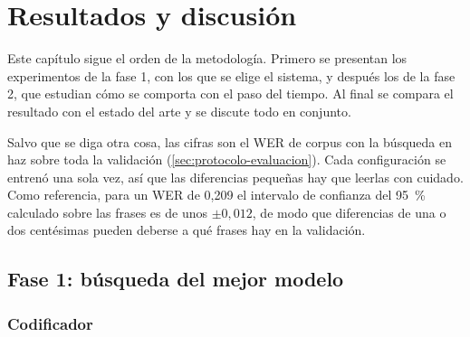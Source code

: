 
\providecommand{\figpendiente}[1]{\fbox{\parbox{0.92\textwidth}{\centering\vspace{1.3cm}\textit{[Figura pendiente: #1]}\vspace{1.3cm}}}}

\chapter{Resultados y discusión}
\label{cap:resultados}

Este capítulo sigue el orden de la metodología. Primero se presentan los experimentos de la fase 1, con los que se elige el sistema, y después los de la fase 2, que estudian cómo se comporta con el paso del tiempo. Al final se compara el resultado con el estado del arte y se discute todo en conjunto.

Salvo que se diga otra cosa, las cifras son el WER de corpus con la búsqueda en haz sobre toda la validación (\cref{sec:protocolo-evaluacion}). Cada configuración se entrenó una sola vez, así que las diferencias pequeñas hay que leerlas con cuidado. Como referencia, para un WER de 0,209 el intervalo de confianza del 95~\% calculado sobre las frases es de unos $\pm 0{,}012$, de modo que diferencias de una o dos centésimas pueden deberse a qué frases hay en la validación.

\section{Fase 1: búsqueda del mejor modelo}
\label{sec:res-fase1}

\subsection{Codificador}
\label{sec:res-codificador}

